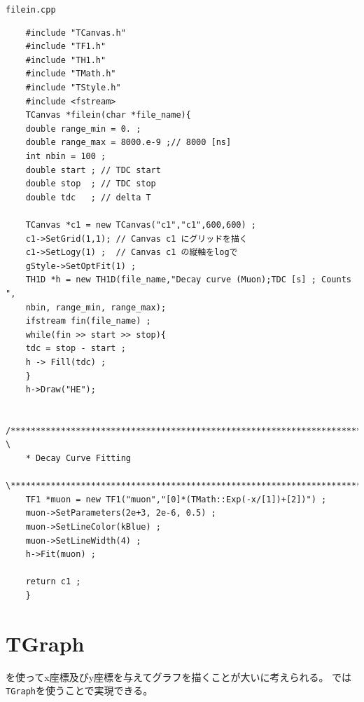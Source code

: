 \documentclass{jarticle}
\begin{document}
 \begin{itembox}{\texttt{filein.cpp}}
\begin{verbatim}
	#include "TCanvas.h"
	#include "TF1.h"
	#include "TH1.h"
	#include "TMath.h"
	#include "TStyle.h"
	#include <fstream>
	TCanvas *filein(char *file_name){
	double range_min = 0. ;
	double range_max = 8000.e-9 ;// 8000 [ns]
	int nbin = 100 ;  
	double start ; // TDC start
	double stop  ; // TDC stop
	double tdc   ; // delta T

	TCanvas *c1 = new TCanvas("c1","c1",600,600) ;
	c1->SetGrid(1,1); // Canvas c1 にグリッドを描く
	c1->SetLogy(1) ;  // Canvas c1 の縦軸をlogで
	gStyle->SetOptFit(1) ;
	TH1D *h = new TH1D(file_name,"Decay curve (Muon);TDC [s] ; Counts ",
	nbin, range_min, range_max);
	ifstream fin(file_name) ;
	while(fin >> start >> stop){
	tdc = stop - start ;
	h -> Fill(tdc) ;
	}
	h->Draw("HE");

	/******************************************************************************** \
	* Decay Curve Fitting
	\********************************************************************************/
	TF1 *muon = new TF1("muon","[0]*(TMath::Exp(-x/[1])+[2])") ;
	muon->SetParameters(2e+3, 2e-6, 0.5) ;
	muon->SetLineColor(kBlue) ;
	muon->SetLineWidth(4) ;
	h->Fit(muon) ;

	return c1 ;
	}
\end{verbatim}
 \end{itembox}



 \clearpage
 \section{TGraph}
 \ROOT を使ってx座標及びy座標を与えてグラフを描くことが大いに考えられる。
 \ROOT では\verb|TGraph|を使うことで実現できる。
 
 
\end{document}
